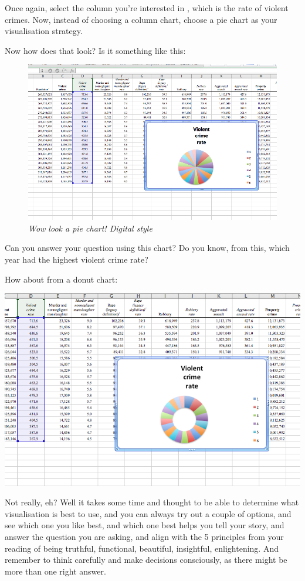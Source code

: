 \documentclass[
]{book}
\begin{document}
Once again, select the column you're interested in , which is the rate of violent crimes. Now, instead of choosing a column chart, choose a pie chart as your visualisation strategy.

Now how does that look? Is it something like this:

\begin{figure}
\centering
\includegraphics{imgs/desc_viz_pie.png}
\caption{\emph{Wow look a pie chart! Digital style}}
\end{figure}

Can you answer your question using this chart? Do you know, from this, which year had the highest violent crime rate?

How about from a donut chart:

\includegraphics{imgs/desc_viz_donut.png}

Not really, eh? Well it takes some time and thought to be able to determine what visualisation is best to use, and you can always try out a couple of options, and see which one you like best, and which one best helps you tell your story, and answer the question you are asking, and align with the 5 principles from your reading of being truthful, functional, beautiful, insightful, enlightening. And remember to think carefully and make decisions consciously, as there might be more than one right answer.
\end{document}
